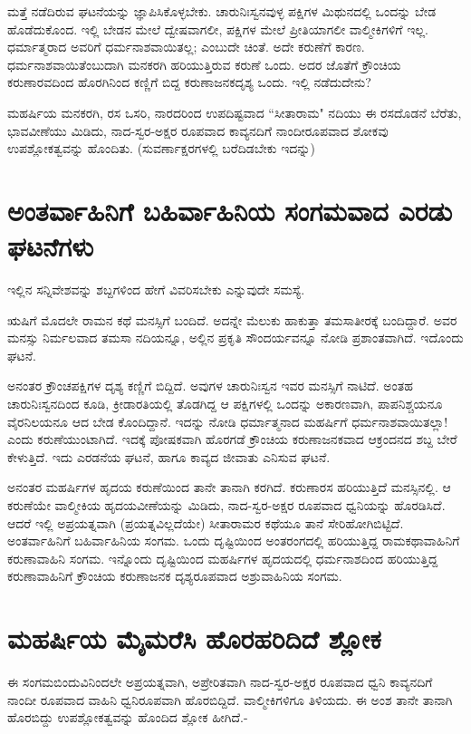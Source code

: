 ಮತ್ತೆ ನಡೆದಿರುವ ಘಟನೆಯನ್ನು ಜ್ಞಾಪಿಸಿಕೊಳ್ಳಬೇಕು. ಚಾರುನಿಃಸ್ವನವುಳ್ಳ ಪಕ್ಷಿಗಳ ಮಿಥುನದಲ್ಲಿ ಒಂದನ್ನು ಬೇಡ ಹೊಡೆದುಕೊಂದ. ಇಲ್ಲಿ ಬೇಡನ ಮೇಲೆ ದ್ವೇಷವಾಗಲೀ, ಪಕ್ಷಿಗಳ ಮೇಲೆ ಪ್ರೀತಿಯಾಗಲೀ ವಾಲ್ಮೀಕಿಗಳಿಗೆ ಇಲ್ಲ. ಧರ್ಮಾತ್ಮರಾದ ಅವರಿಗೆ ಧರ್ಮನಾಶವಾಯಿತಲ್ಲ; ಎಂಬುದೇ ಚಿಂತೆ. ಅದೇ ಕರುಣೆಗೆ ಕಾರಣ. ಧರ್ಮನಾಶವಾಯಿತೆಂಬುದಾಗಿ ಮನಕರಗಿ ಹರಿಯುತ್ತಿರುವ ಕರುಣೆ ಒಂದು. ಅದರ ಜೊತೆಗೆ ಕ್ರೌಂಚಿಯ ಕರುಣಾರವದಿಂದ ಹೊರಗಿನಿಂದ ಕಣ್ಣಿಗೆ ಬಿದ್ದ ಕರುಣಾಜನಕದೃಶ್ಯ ಒಂದು. ಇಲ್ಲಿ ನಡೆದುದೇನು? 

ಮಹರ್ಷಿಯ ಮನಕರಗಿ, ರಸ ಒಸರಿ, ನಾರದರಿಂದ ಉಪದಿಷ್ಟವಾದ ``ಸೀತಾರಾಮ" ನದಿಯು ಈ ರಸದೊಡನೆ ಬೆರೆತು, ಭಾವವೀಣೆಯು ಮಿಡಿದು, ನಾದ-ಸ್ವರ-ಅಕ್ಷರ ರೂಪವಾದ ಕಾವ್ಯನದಿಗೆ ನಾಂದೀರೂಪವಾದ ಶೋಕವು ಉಪಶ್ಲೋಕತ್ವವನ್ನು ಹೊಂದಿತು. (ಸುವರ್ಣಾಕ್ಷರಗಳಲ್ಲಿ ಬರೆದಿಡಬೇಕು ಇದನ್ನು) 

\section*{ಅಂತರ್ವಾಹಿನಿಗೆ ಬಹಿರ್ವಾಹಿನಿಯ ಸಂಗಮವಾದ ಎರಡು ಘಟನೆಗಳು} 

ಇಲ್ಲಿನ ಸನ್ನಿವೇಶವನ್ನು ಶಬ್ದಗಳಿಂದ ಹೇಗೆ ವಿವರಿಸಬೇಕು ಎನ್ನುವುದೇ ಸಮಸ್ಯೆ. 

ಋಷಿಗೆ ಮೊದಲೇ ರಾಮನ ಕಥೆ ಮನಸ್ಸಿಗೆ ಬಂದಿದೆ. ಅದನ್ನೇ ಮೆಲುಕು ಹಾಕುತ್ತಾ ತಮಸಾತೀರಕ್ಕೆ ಬಂದಿದ್ದಾರೆ. ಅವರ ಮನಸ್ಸು ನಿರ್ಮಲವಾದ ತಮಸಾ ನದಿಯನ್ನೂ, ಅಲ್ಲಿನ ಪ್ರಕೃತಿ ಸೌಂದರ್ಯವನ್ನೂ ನೋಡಿ ಪ್ರಶಾಂತವಾಗಿದೆ. ಇದೊಂದು ಘಟನೆ. 


ಅನಂತರ ಕ್ರೌಂಚಪಕ್ಷಿಗಳ ದೃಶ್ಯ ಕಣ್ಣಿಗೆ ಬಿದ್ದಿದೆ. ಅವುಗಳ ಚಾರುನಿಃಸ್ವನ ಇವರ ಮನಸ್ಸಿಗೆ ನಾಟಿದೆ. ಅಂತಹ ಚಾರುನಿಃಸ್ವನದಿಂದ ಕೂಡಿ, ಕ್ರೀಡಾರತಿಯಲ್ಲಿ ತೊಡಗಿದ್ದ ಆ ಪಕ್ಷಿಗಳಲ್ಲಿ ಒಂದನ್ನು ಅಕಾರಣವಾಗಿ, ಪಾಪನಿಶ್ಚಯನೂ ವೈರನಿಲಯನೂ ಆದ ಬೇಡ ಕೊಂದಿದ್ದಾನೆ. ಇದನ್ನು ನೋಡಿ ಧರ್ಮಾತ್ಮನಾದ ಮಹರ್ಷಿಗೆ ಧರ್ಮನಾಶವಾಯಿತಲ್ಲಾ! ಎಂದು ಕರುಣೆಯುಂಟಾಗಿದೆ. ಇದಕ್ಕೆ ಪೋಷಕವಾಗಿ ಹೊರಗಡೆ ಕ್ರೌಂಚಿಯ ಕರುಣಾಜನಕವಾದ ಆಕ್ರಂದನದ ಶಬ್ದ ಬೇರೆ ಕೇಳುತ್ತಿದೆ. ಇದು ಎರಡನೆಯ ಘಟನೆ, ಹಾಗೂ ಕಾವ್ಯದ ಜೀವಾತು ಎನಿಸುವ ಘಟನೆ. 


ಅನಂತರ ಮಹರ್ಷಿಗಳ ಹೃದಯ ಕರುಣೆಯಿಂದ ತಾನೇ ತಾನಾಗಿ ಕರಗಿದೆ. ಕರುಣಾರಸ ಹರಿಯುತ್ತಿದೆ ಮನಸ್ಸಿನಲ್ಲಿ. ಆ ಕರುಣೆಯೇ ವಾಲ್ಮೀಕಿಯ ಹೃದಯವೀಣೆಯನ್ನು ಮಿಡಿದು, ನಾದ-ಸ್ವರ-ಅಕ್ಷರ ರೂಪವಾದ ಧ್ವನಿಯನ್ನು ಹೊರಡಿಸಿದೆ. ಆದರೆ ಇಲ್ಲಿ ಅಪ್ರಯತ್ನವಾಗಿ (ಪ್ರಯತ್ನವಿಲ್ಲದೆಯೇ) ಸೀತಾರಾಮರ ಕಥೆಯೂ ತಾನೆ ಸೇರಿಹೋಗಿಬಿಟ್ಟಿದೆ. ಅಂತರ್ವಾಹಿನಿಗೆ ಬಹಿರ್ವಾಹಿನಿಯ ಸಂಗಮ. ಒಂದು ದೃಷ್ಟಿಯಿಂದ ಅಂತರಂಗದಲ್ಲಿ ಹರಿಯುತ್ತಿದ್ದ ರಾಮಕಥಾವಾಹಿನಿಗೆ ಕರುಣಾವಾಹಿನಿ ಸಂಗಮ. ಇನ್ನೊಂದು ದೃಷ್ಟಿಯಿಂದ ಮಹರ್ಷಿಗಳ ಹೃದಯದಲ್ಲಿ ಧರ್ಮನಾಶದಿಂದ ಹರಿಯುತ್ತಿದ್ದ ಕರುಣಾವಾಹಿನಿಗೆ ಕ್ರೌಂಚಿಯ ಕರುಣಾಜನಕ ದೃಶ್ಯರೂಪವಾದ ಅಶ್ರುವಾಹಿನಿಯ ಸಂಗಮ. 

\section*{ಮಹರ್ಷಿಯ ಮೈಮರೆಸಿ ಹೊರಹರಿದಿದೆ ಶ್ಲೋಕ} 

ಈ ಸಂಗಮಬಿಂದುವಿನಿಂದಲೇ ಅಪ್ರಯತ್ನವಾಗಿ, ಅಪ್ರೇರಿತವಾಗಿ ನಾದ-ಸ್ವರ-ಅಕ್ಷರ ರೂಪವಾದ ಧ್ವನಿ ಕಾವ್ಯನದಿಗೆ ನಾಂದೀ ರೂಪವಾದ ವಾಹಿನಿ ಧ್ವನಿರೂಪವಾಗಿ ಹೊರಬಿದ್ದಿದೆ. ವಾಲ್ಮೀಕಿಗಳಿಗೂ ತಿಳಿಯದು. ಈ ಅಂಶ ತಾನೇ ತಾನಾಗಿ ಹೊರಬಿದ್ದು ಉಪಶ್ಲೋಕತ್ವವನ್ನು ಹೊಂದಿದ ಶ್ಲೋಕ ಹೀಗಿದೆ.- 

